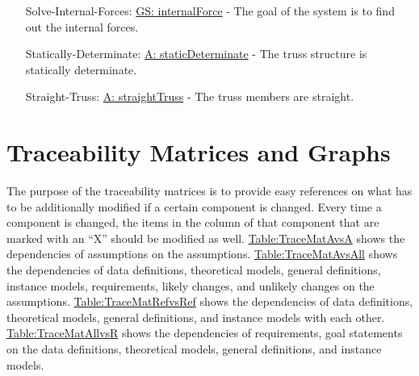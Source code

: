 \documentclass[12pt]{article}
\begin{document}
\begin{itemize}
\item[Solve-Internal-Forces:\phantomsection\label{unlikeChgSIF}]{\hyperref[internalForce]{GS: internalForce} -  The goal of the system is to find out the internal forces.}
\item[Statically-Determinate:\phantomsection\label{unlikeChgStatD}]{\hyperref[staticDeterminate]{A: staticDeterminate} -  The truss structure is statically determinate.}
\item[Straight-Truss:\phantomsection\label{unlikeChgST}]{\hyperref[straightTruss]{A: straightTruss} -  The truss members are straight.}
\end{itemize}
\section{Traceability Matrices and Graphs}
\label{Sec:TraceMatrices}
The purpose of the traceability matrices is to provide easy references on what has to be additionally modified if a certain component is changed. Every time a component is changed, the items in the column of that component that are marked with an ``X'' should be modified as well. \hyperref[Table:TraceMatAvsA]{Table:TraceMatAvsA} shows the dependencies of assumptions on the assumptions. \hyperref[Table:TraceMatAvsAll]{Table:TraceMatAvsAll} shows the dependencies of data definitions, theoretical models, general definitions, instance models, requirements, likely changes, and unlikely changes on the assumptions. \hyperref[Table:TraceMatRefvsRef]{Table:TraceMatRefvsRef} shows the dependencies of data definitions, theoretical models, general definitions, and instance models with each other. \hyperref[Table:TraceMatAllvsR]{Table:TraceMatAllvsR} shows the dependencies of requirements, goal statements on the data definitions, theoretical models, general definitions, and instance models.
\end{document}
